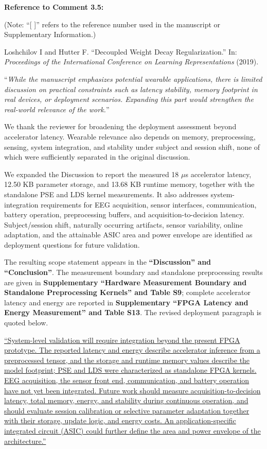 \documentclass[12pt,technote,onecolumn]{IEEEtran}
\begin{document}
\noindent \textbf{Reference to Comment 3.5:}

\noindent(Note: ``[ ]'' refers to the reference number used in the manuscript or Supplementary Information.)

\noindent[7]\:Loshchilov I and Hutter F. ``Decoupled Weight Decay Regularization.'' In: \textit{Proceedings of the International Conference on Learning Representations} (2019).

\vspace{4mm}

``{\it While the manuscript emphasizes potential wearable applications, there
is limited discussion on practical constraints such as latency
stability, memory footprint in real devices, or deployment scenarios.
Expanding this part would strengthen the real-world relevance of the
work.}''
\vspace{1mm}


We thank the reviewer for broadening the deployment assessment beyond accelerator latency. Wearable relevance also depends on memory, preprocessing, sensing, system integration, and stability under subject and session shift, none of which were sufficiently separated in the original discussion.

We expanded the Discussion to report the measured 18 $\mu$s accelerator
latency, 12.50 KB parameter storage, and 13.68 KB runtime memory,
together with the standalone PSE and LDS kernel measurements. It also
addresses system-integration requirements for EEG acquisition, sensor
interfaces, communication, battery operation, preprocessing buffers, and
acquisition-to-decision latency. Subject/session shift, naturally
occurring artifacts, sensor variability, online adaptation, and the
attainable ASIC area and power envelope are identified as deployment
questions for future validation.



The resulting scope statement appears in the \textbf{``Discussion'' and ``Conclusion''}. The measurement boundary and standalone preprocessing results are given in \textbf{Supplementary ``Hardware Measurement Boundary and Standalone Preprocessing Kernels'' and Table S9}; complete accelerator latency and energy are reported in \textbf{Supplementary ``FPGA Latency and Energy Measurement'' and Table S13}. The revised deployment paragraph is quoted below.

\uline{``System-level validation will require integration beyond the present FPGA prototype. The reported latency and energy describe accelerator inference from a preprocessed tensor, and the storage and runtime memory values describe the model footprint; PSE and LDS were characterized as standalone FPGA kernels. EEG acquisition, the sensor front end, communication, and battery operation have not yet been integrated. Future work should measure acquisition-to-decision latency, total memory, energy, and stability during continuous operation, and should evaluate session calibration or selective parameter adaptation together with their storage, update logic, and energy costs. An application-specific integrated circuit (ASIC) could further define the area and power envelope of the architecture.''}
\end{document}
